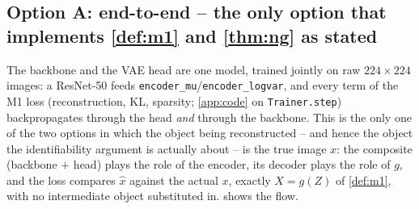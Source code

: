 \subsection[Option A: end-to-end]{Option A: end-to-end -- the only option that implements \cref{def:m1} and \cref{thm:ng} as stated}
\label{sec:archA}
The backbone and the VAE head are one model, trained jointly on raw $224\times224$ images: a
ResNet-50 feeds \texttt{encoder\_mu}/\texttt{encoder\_logvar}, and every term of the M1 loss
(reconstruction, KL, sparsity; \cref{app:code} on \texttt{Trainer.step}) backpropagates through the
head \emph{and} through the backbone. This is the only one of the two options in which the object
being reconstructed -- and hence the object the identifiability argument is actually about -- is the
true image $x$: the composite (backbone $+$ head) plays the role of the encoder, its decoder plays the
role of $g$, and the loss compares $\hat x$ against the actual $x$, exactly $X=g(Z)$ of \cref{def:m1},
with no intermediate object substituted in.  shows the flow.

